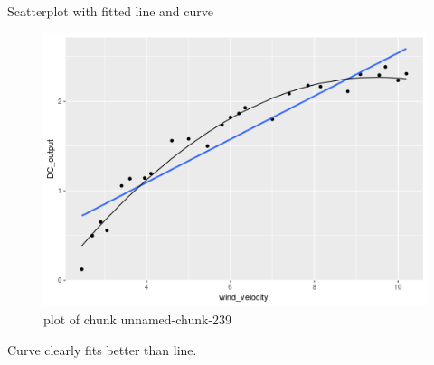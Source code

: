 \documentclass[ignorenonframetext,]{beamer}
\begin{document}
\begin{frame}{Scatterplot with fitted line and curve}
\protect\hypertarget{scatterplot-with-fitted-line-and-curve-1}{}

\begin{figure}
\centering
\includegraphics{figure/unnamed-chunk-239-1.png}
\caption{plot of chunk unnamed-chunk-239}
\end{figure}

Curve clearly fits better than line.

\end{frame}
\end{document}
